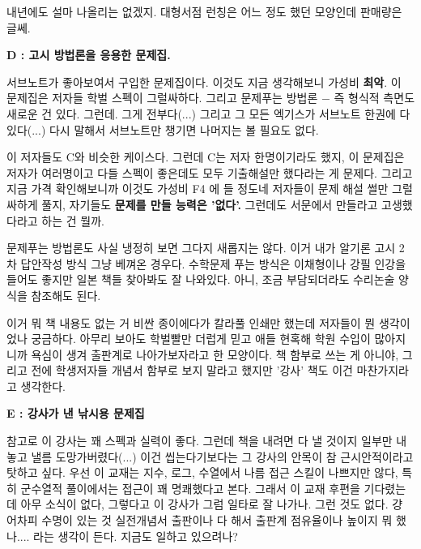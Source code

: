 내년에도 설마 나올리는 없겠지. 대형서점 런칭은 어느 정도 했던 모양인데 판매량은 글쎄.
\vspace{5mm}

\textbf{D : 고시 방법론을 응용한 문제집.}
\vspace{5mm}

서브노트가 좋아보여서 구입한 문제집이다. 이것도 지금 생각해보니 가성비 \textbf{최악}.
이 문제집은 저자들 학벌 스펙이 그럴싸하다. 그리고 문제푸는 방법론 $-$ 즉 형식적 측면도 새로운 건 있다.
그런데. 그게 전부다(...) 그리고 그 모든 엑기스가 서브노트 한권에 다 있다(...)
다시 말해서 서브노트만 챙기면 나머지는 볼 필요도 없다.
\vspace{5mm}

이 저자들도 C와 비슷한 케이스다. 그런데 C는 저자 한명이기라도 했지, 이 문제집은 저자가 여러명이고 다들 스펙이 좋은데도
모두 기출해설만 했다라는 게 문제다. 그리고 지금 가격 확인해보니까 이것도 가성비 F4 에 들 정도네
저자들이 문제 해설 썰만 그럴싸하게 풀지, 자기들도 \textbf{문제를 만들 능력은 '없다'.}
그런데도 서문에서 만들라고 고생했다라고 하는 건 뭘까.
\vspace{5mm}

문제푸는 방법론도 사실 냉정히 보면 그다지 새롭지는 않다. 이거 내가 알기론 고시 2차 답안작성 방식 그냥 베껴온 경우다.
수학문제 푸는 방식은 이채형이나 강필 인강을 들어도 좋지만 일본 책들 찾아봐도 잘 나와있다.
아니, 조금 부담되더라도 수리논술 양식을 참조해도 된다.
\vspace{5mm}

이거 뭐 책 내용도 없는 거 비싼 종이에다가 칼라풀 인쇄만 했는데 저자들이 뭔 생각이었나 궁금하다.
아무리 보아도 학벌빨만 더럽게 믿고 애들 현혹해 학원 수입이 많아지니까 욕심이 생겨 출판계로 나아가보자라고 한 모양이다.
책 함부로 쓰는 게 아니야, 그리고 전에 학생저자들 개념서 함부로 보지 말라고 했지만 '강사' 책도 이건 마찬가지라고 생각한다.
\vspace{5mm}

\textbf{E : 강사가 낸 낚시용 문제집}
\vspace{5mm}

참고로 이 강사는 꽤 스펙과 실력이 좋다. 그런데 책을 내려면 다 낼 것이지 일부만 내놓고 낼름 도망가버렸다(...)
이건 씹는다기보다는 그 강사의 안목이 참 근시안적이라고 탓하고 싶다.
우선 이 교재는 지수, 로그, 수열에서 나름 접근 스킬이 나쁘지만 않다, 특히 군수열적 풀이에서는 접근이 꽤 명쾌했다고 본다.
그래서 이 교재 후편을 기다렸는데 아무 소식이 없다, 그렇다고 이 강사가 그럼 일타로 잘 나가나. 그런 것도 없다.
걍 어차피 수명이 있는 것 실전개념서 출판이나 다 해서 출판계 점유율이나 높이지 뭐 했나.... 라는 생각이 든다. 지금도 일하고 있으려나?
\vspace{5mm}

